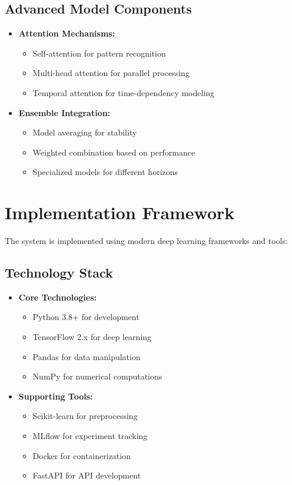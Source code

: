 \documentclass[12pt,a4paper]{report}
\begin{document}
\subsection{Advanced Model Components}
\begin{itemize}
\item \textbf{Attention Mechanisms:}
  \begin{itemize}
    \item Self-attention for pattern recognition
    \item Multi-head attention for parallel processing
    \item Temporal attention for time-dependency modeling
  \end{itemize}

\item \textbf{Ensemble Integration:}
  \begin{itemize}
    \item Model averaging for stability
    \item Weighted combination based on performance
    \item Specialized models for different horizons
  \end{itemize}
\end{itemize}

\section{Implementation Framework}
The system is implemented using modern deep learning frameworks and tools:

\subsection{Technology Stack}
\begin{itemize}
\item \textbf{Core Technologies:}
  \begin{itemize}
    \item Python 3.8+ for development
    \item TensorFlow 2.x for deep learning
    \item Pandas for data manipulation
    \item NumPy for numerical computations
  \end{itemize}

\item \textbf{Supporting Tools:}
  \begin{itemize}
    \item Scikit-learn for preprocessing
    \item MLflow for experiment tracking
    \item Docker for containerization
    \item FastAPI for API development
  \end{itemize}
\end{itemize}
\end{document}
